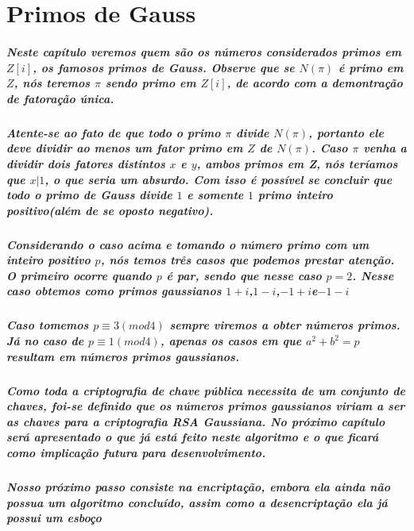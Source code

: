 \section{Primos de Gauss}
\subparagraph{
Neste cap\'itulo veremos quem s\~ao os n\'umeros considerados primos em $Z[i]$, os famosos primos de Gauss. Observe que se $N(\pi)$ \'e primo em $Z$, n\'os teremos $\pi$ sendo primo em $Z[i]$, de acordo com a demontra\c{c}\~ao de fatora\c{c}\~ao \'unica. }
\subparagraph{
Atente-se ao fato de que todo o primo $\pi$ divide $N(\pi)$, portanto ele deve dividir ao menos um fator primo em $Z$ de $N(\pi)$. Caso $\pi$ venha a dividir dois fatores distintos $x$ e $y$, ambos primos em Z, n\'os ter\'iamos que $x|1$, o que seria um absurdo. Com isso \'e poss\'ivel se concluir que todo o primo de Gauss divide $1$ e somente $1$ primo inteiro positivo(al\'em de se oposto negativo).
}
\subparagraph{
Considerando o caso acima e tomando o n\'umero primo com um inteiro positivo $p$, n\'os temos tr\^es casos que podemos prestar aten\c{c}\~ao. O primeiro ocorre quando $p$ \'e par, sendo que nesse caso $p=2$. Nesse caso obtemos como primos gaussianos $1+i$,$ 1-i$,$ -1+i $e$ -1-i $}
\subparagraph{
Caso tomemos $p \equiv 3(mod 4)$ sempre viremos a obter n\'umeros primos. J\'a no caso de $p \equiv 1(mod 4)$, apenas os casos em que $a^2+b^2=p$ resultam em n\'umeros primos gaussianos.
}
\subparagraph{
Como toda a criptografia de chave p\'ublica necessita de um conjunto de chaves, foi-se definido que os n\'umeros primos gaussianos viriam a ser as chaves para a criptografia RSA Gaussiana. No pr\'oximo cap\'itulo ser\'a apresentado o que j\'a est\'a feito neste algoritmo e o que ficar\'a como implica\c{c}\~ao futura para desenvolvimento.}
\subparagraph{
Nosso pr\'oximo passo consiste na encripta\c{c}\~ao, embora ela ainda n\~ao possua um algoritmo concluído, assim como a desencripta\c{c}\~ao ela j\'a possui um esbo\c{c}o
}